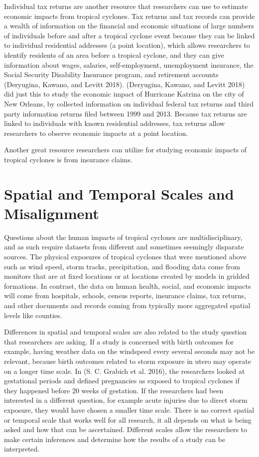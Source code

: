 \documentclass[
]{article}
\begin{document}
Individual tax returns are another resource that researchers can use to
estimate economic impacts from tropical cyclones. Tax returns and tax
records can provide a wealth of information on the financial and
economic situations of large numbers of individuals before and after a
tropical cyclone event because they can be linked to individual
residential addresses (a point location), which allows researchers to
identify residents of an area before a tropical cyclone, and they can
give information about wages, salaries, self-employment, unemployment
insurance, the Social Security Disability Insurance program, and
retirement accounts (Deryugina, Kawano, and Levitt 2018). (Deryugina,
Kawano, and Levitt 2018) did just this to study the economic impact of
Hurricane Katrina on the city of New Orleans, by collected information
on individual federal tax returns and third party information returns
filed between 1999 and 2013. Because tax returns are linked to
individuals with known residential addresses, tax returns allow
researchers to observe economic impacts at a point location.

Another great resource researchers can utilize for studying economic
impacts of tropical cyclones is from insurance claims.

\hypertarget{spatial-and-temporal-scales-and-misalignment}{%
\section{Spatial and Temporal Scales and
Misalignment}\label{spatial-and-temporal-scales-and-misalignment}}

Questions about the human impacts of tropical cyclones are
multidisciplinary, and as such require datasets from different and
sometimes seemingly disparate sources. The physical exposures of
tropical cyclones that were mentioned above such as wind speed, storm
tracks, precipitation, and flooding data come from monitors that are at
fixed locations or at locations created by models in gridded formations.
In contrast, the data on human health, social, and economic impacts will
come from hospitals, schools, census reports, insurance claims, tax
returns, and other documents and records coming from typically more
aggregated spatial levels like counties.

Differences in spatial and temporal scales are also related to the study
question that researchers are asking. If a study is concerned with birth
outcomes for example, having weather data on the windspeed every several
seconds may not be relevant, because birth outcomes related to storm
exposure in utero may operate on a longer time scale. In (S. C. Grabich
et al. 2016), the researchers looked at gestational periods and defined
pregnancies as exposed to tropical cyclones if they happened before 20
weeks of gestation. If the researchers had been interested in a
different question, for example acute injuries due to direct storm
exposure, they would have chosen a smaller time scale. There is no
correct spatial or temporal scale that works well for all research, it
all depends on what is being asked and how that can be ascertained.
Different scales allow the researchers to make certain inferences and
determine how the results of a study can be interpreted.
\end{document}
